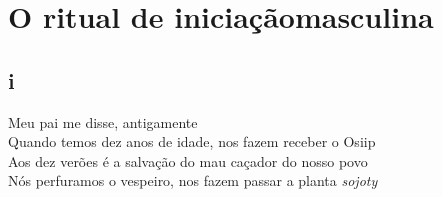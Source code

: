 
\chapter*{O ritual de iniciação\break masculina}

\section{i}

\begin{linenumbers}\begingroup\raggedright
 \noindent Meu pai me disse, antigamente\\
 Quando temos dez anos de idade, nos fazem receber o Osiip\\
 Aos dez verões é a salvação do mau caçador do nosso povo\\
 Nós perfuramos o vespeiro, nos fazem passar a planta \emph{sojoty}

\end{linenumbers}\endgroup

\bigskip


